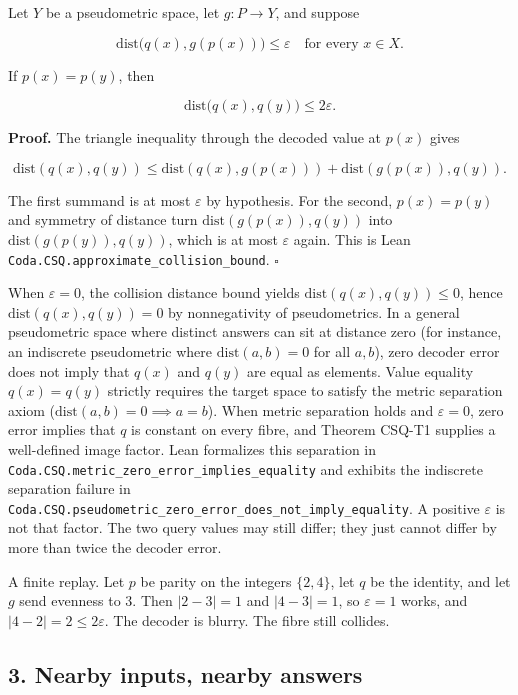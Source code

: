 \documentclass[
  11pt,
]{article}
\begin{document}
Let \(Y\) be a pseudometric space, let \(g:P\to Y\), and suppose

\[
\mathrm{dist}\bigl(q(x),g(p(x))\bigr)\le\varepsilon
\quad\text{for every }x\in X.
\]

If \(p(x)=p(y)\), then

\[
\mathrm{dist}\bigl(q(x),q(y)\bigr)\le 2\varepsilon.
\]

\textbf{Proof.} The triangle inequality through the decoded value at \(p(x)\) gives

\[
\mathrm{dist}(q(x),q(y))
\le
\mathrm{dist}(q(x),g(p(x)))
+
\mathrm{dist}(g(p(x)),q(y)).
\]

The first summand is at most \(\varepsilon\) by hypothesis. For the second, \(p(x)=p(y)\) and symmetry of distance turn \(\mathrm{dist}(g(p(x)),q(y))\) into \(\mathrm{dist}(g(p(y)),q(y))\), which is at most \(\varepsilon\) again. This is Lean \nolinkurl{Coda.CSQ.approximate_collision_bound}. \(\square\)

When \(\varepsilon=0\), the collision distance bound yields \(\mathrm{dist}(q(x), q(y)) \le 0\), hence \(\mathrm{dist}(q(x), q(y)) = 0\) by nonnegativity of pseudometrics. In a general pseudometric space where distinct answers can sit at distance zero (for instance, an indiscrete pseudometric where \(\mathrm{dist}(a,b)=0\) for all \(a, b\)), zero decoder error does not imply that \(q(x)\) and \(q(y)\) are equal as elements. Value equality \(q(x) = q(y)\) strictly requires the target space to satisfy the metric separation axiom (\(\mathrm{dist}(a, b) = 0 \implies a = b\)). When metric separation holds and \(\varepsilon=0\), zero error implies that \(q\) is constant on every fibre, and Theorem CSQ-T1 supplies a well-defined image factor. Lean formalizes this separation in \nolinkurl{Coda.CSQ.metric_zero_error_implies_equality} and exhibits the indiscrete separation failure in \nolinkurl{Coda.CSQ.pseudometric_zero_error_does_not_imply_equality}. A positive \(\varepsilon\) is not that factor. The two query values may still differ; they just cannot differ by more than twice the decoder error.

A finite replay. Let \(p\) be parity on the integers \(\{2,4\}\), let \(q\) be the identity, and let \(g\) send evenness to \(3\). Then \(|2-3|=1\) and \(|4-3|=1\), so \(\varepsilon=1\) works, and \(|4-2|=2\le 2\varepsilon\). The decoder is blurry. The fibre still collides.

\subsection{3. Nearby inputs, nearby answers}\label{nearby-inputs-nearby-answers}
\end{document}
